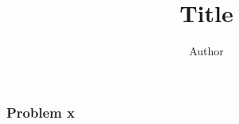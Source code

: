 \documentclass[12pt]{article}
\title{Title}
\author{Author}
\begin{document}
\subsubsection*{Problem x}
\end{document}
